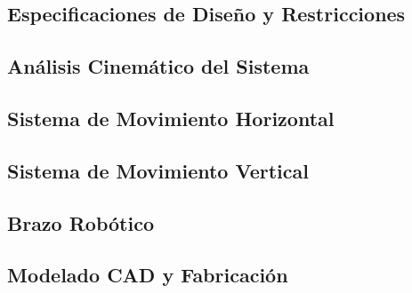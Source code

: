 \documentclass[a4paper,12pt]{report}
\begin{document}
\subsection{Especificaciones de Diseño y Restricciones}


\subsection{Análisis Cinemático del Sistema}





\subsection{Sistema de Movimiento Horizontal}


%

\subsection{Sistema de Movimiento Vertical}


%

\subsection{Brazo Robótico}

%


\subsection{Modelado CAD y Fabricación}
%

%
\end{document}
